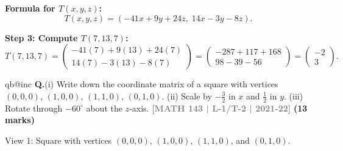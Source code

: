 \documentclass[12pt,a3paper]{article}
\makeatletter
\newcommand{\yr}[1]{\hfill\textcolor{gray}{\small\textbf{[#1]}}}
\newcommand{\mk}[1]{\textcolor{orange!70!black}{\small\textbf{(#1 marks)}}}
\newcounter{qnum}
\newcommand{\Q}[1]{%
  \csname qb@inc\endcsname
  \needspace{4\baselineskip}
  \refstepcounter{qnum}
  \vspace{6pt}
  \noindent\textbf{Q\theqnum.}\enspace #1\par
}
\makeatother
\begin{document}
\begin{tcolorbox}
\textbf{Formula for $T(x,y,z)$:}
\[
T(x,y,z)=(-41x+9y+24z,\;14x-3y-8z).
\]

\textbf{Step 3: Compute $T(7,13,7)$:}
\[
T(7,13,7)=\begin{pmatrix}-41(7)+9(13)+24(7)\\14(7)-3(13)-8(7)\end{pmatrix}=\begin{pmatrix}-287+117+168\\98-39-56\end{pmatrix}=\boxed{\begin{pmatrix}-2\\3\end{pmatrix}}.
\]

\end{tcolorbox}

\Q{(i) Write down the coordinate matrix of a square with vertices $(0,0,0)$, $(1,0,0)$, $(1,1,0)$, $(0,1,0)$. (ii) Scale by $-\frac{3}{2}$ in $x$ and $\frac{1}{2}$ in $y$. (iii) Rotate through $-60^\circ$ about the $z$-axis.
\yr{MATH 143 | L-1/T-2 | 2021-22} \mk{13}}

\begin{center}
    
    \vspace{0.4cm}
    \flushleft
    View 1: Square with vertices $(0, 0, 0)$, $(1, 0, 0)$, $(1, 1, 0)$, and $(0, 1, 0)$.
  \end{center}
\end{document}
